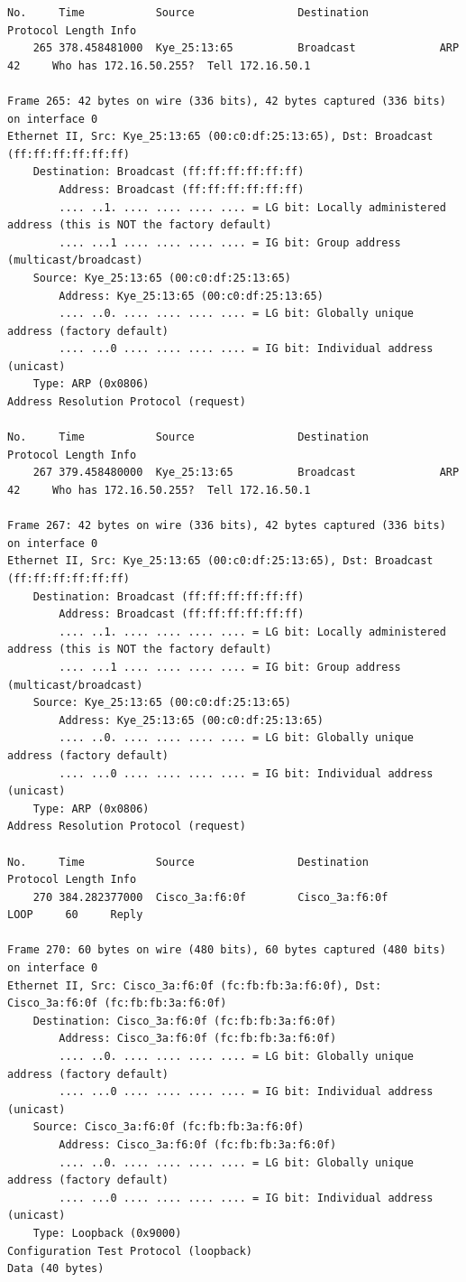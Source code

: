 \documentclass[a4paper,11pt]{article}
\begin{document}
\begin{lstlisting}
No.     Time           Source                Destination           Protocol Length Info
    265 378.458481000  Kye_25:13:65          Broadcast             ARP      42     Who has 172.16.50.255?  Tell 172.16.50.1

Frame 265: 42 bytes on wire (336 bits), 42 bytes captured (336 bits) on interface 0
Ethernet II, Src: Kye_25:13:65 (00:c0:df:25:13:65), Dst: Broadcast (ff:ff:ff:ff:ff:ff)
    Destination: Broadcast (ff:ff:ff:ff:ff:ff)
        Address: Broadcast (ff:ff:ff:ff:ff:ff)
        .... ..1. .... .... .... .... = LG bit: Locally administered address (this is NOT the factory default)
        .... ...1 .... .... .... .... = IG bit: Group address (multicast/broadcast)
    Source: Kye_25:13:65 (00:c0:df:25:13:65)
        Address: Kye_25:13:65 (00:c0:df:25:13:65)
        .... ..0. .... .... .... .... = LG bit: Globally unique address (factory default)
        .... ...0 .... .... .... .... = IG bit: Individual address (unicast)
    Type: ARP (0x0806)
Address Resolution Protocol (request)

No.     Time           Source                Destination           Protocol Length Info
    267 379.458480000  Kye_25:13:65          Broadcast             ARP      42     Who has 172.16.50.255?  Tell 172.16.50.1

Frame 267: 42 bytes on wire (336 bits), 42 bytes captured (336 bits) on interface 0
Ethernet II, Src: Kye_25:13:65 (00:c0:df:25:13:65), Dst: Broadcast (ff:ff:ff:ff:ff:ff)
    Destination: Broadcast (ff:ff:ff:ff:ff:ff)
        Address: Broadcast (ff:ff:ff:ff:ff:ff)
        .... ..1. .... .... .... .... = LG bit: Locally administered address (this is NOT the factory default)
        .... ...1 .... .... .... .... = IG bit: Group address (multicast/broadcast)
    Source: Kye_25:13:65 (00:c0:df:25:13:65)
        Address: Kye_25:13:65 (00:c0:df:25:13:65)
        .... ..0. .... .... .... .... = LG bit: Globally unique address (factory default)
        .... ...0 .... .... .... .... = IG bit: Individual address (unicast)
    Type: ARP (0x0806)
Address Resolution Protocol (request)

No.     Time           Source                Destination           Protocol Length Info
    270 384.282377000  Cisco_3a:f6:0f        Cisco_3a:f6:0f        LOOP     60     Reply

Frame 270: 60 bytes on wire (480 bits), 60 bytes captured (480 bits) on interface 0
Ethernet II, Src: Cisco_3a:f6:0f (fc:fb:fb:3a:f6:0f), Dst: Cisco_3a:f6:0f (fc:fb:fb:3a:f6:0f)
    Destination: Cisco_3a:f6:0f (fc:fb:fb:3a:f6:0f)
        Address: Cisco_3a:f6:0f (fc:fb:fb:3a:f6:0f)
        .... ..0. .... .... .... .... = LG bit: Globally unique address (factory default)
        .... ...0 .... .... .... .... = IG bit: Individual address (unicast)
    Source: Cisco_3a:f6:0f (fc:fb:fb:3a:f6:0f)
        Address: Cisco_3a:f6:0f (fc:fb:fb:3a:f6:0f)
        .... ..0. .... .... .... .... = LG bit: Globally unique address (factory default)
        .... ...0 .... .... .... .... = IG bit: Individual address (unicast)
    Type: Loopback (0x9000)
Configuration Test Protocol (loopback)
Data (40 bytes)


\end{lstlisting}
\end{document}
